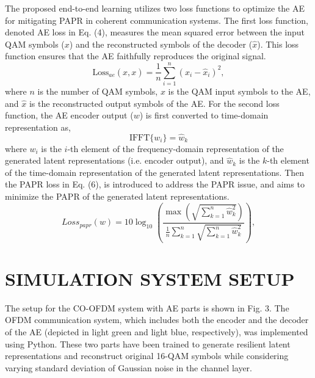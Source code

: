 \documentclass[conference]{IEEEtran}
\begin{document}
The proposed end-to-end learning utilizes two loss functions to optimize the AE for mitigating PAPR in coherent communication systems. The first loss function, denoted AE loss in Eq. (4), measures the mean squared error between the input QAM symbols ($x$) and the reconstructed symbols of the decoder ($\hat{x}$). This loss function ensures that the AE faithfully reproduces the original signal.
\begin{equation}
\text{Loss}_{ae}(\hat{x}, x) = \frac{1}{n} \sum_{i=1}^{n} (x_i - \hat{x}_i)^2,
\end{equation}
where $n$ is the number of QAM symbols, $x$ is the QAM input symbols to the AE, and $\hat{x}$ is the reconstructed output symbols of the AE. For the second loss function, the AE encoder output ($w$) is first converted to time-domain representation as,
\begin{equation}
\text{IFFT} \{w_i\} = \hat{w}_k
\end{equation}
where $w_i$ is the $i$-th element of the frequency-domain representation of the generated latent representations (i.e. encoder output), and $\hat{w}_k$ is the $k$-th element of the time-domain representation of the generated latent representations. Then the PAPR loss in Eq. (6), is introduced to address the PAPR issue, and aims to minimize the PAPR of the generated latent representations.
\begin{equation}
Loss_{papr} (w) = 10 \log_{10} \left( \frac{\max \left( \sqrt{\sum_{k=1}^{n} \hat{w}_k^2} \right)}{\frac{1}{n} \sum_{k=1}^{n} \sqrt{\sum_{k=1}^{n} \hat{w}_k^2}} \right),
\end{equation}

\section{SIMULATION SYSTEM SETUP}
The setup for the CO-OFDM system with AE parts is shown in Fig. 3. The OFDM communication system, which includes both the encoder and the decoder of the AE (depicted in light green and light blue, respectively), was implemented using Python. These two parts have been trained to generate resilient latent representations and reconstruct original 16-QAM symbols while considering varying standard deviation of Gaussian noise in the channel layer.
\end{document}
